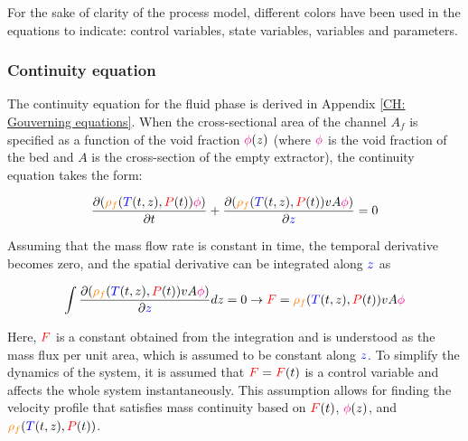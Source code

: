 \documentclass[../Article_Model_Parameters.tex]{subfiles}
\begin{document}
		
	For the sake of clarity of the process model, different colors have been used in the equations to indicate: 
	{\color{red}control variables},
	{\color{blue}state variables},
	{\color{orange}variables} and
	{\color{magenta}parameters}.
	
	\subsubsection{Continuity equation} \label{CH: Continuity}
	The continuity equation for the fluid phase is derived in Appendix \ref{CH: Gouverning equations}. When the cross-sectional area of the channel $A_f$ is specified as a function of the void fraction ${\color{magenta}\phi}(z)$ (where ${\color{magenta}\phi}$ is the void fraction of the bed and $A$ is the cross-section of the empty extractor), the continuity equation takes the form: 
	
	{\footnotesize
		\begin{equation*}
			\frac{\partial ({\color{orange}\rho_f}({\color{blue}T}(t,z),{\color{red}P}(t)) {\color{magenta}\phi})}{\partial t} + \frac{\partial ({\color{orange}\rho_f}({\color{blue}T}(t,z),{\color{red}P}(t)) v A {\color{magenta}\phi})}{\partial {\color{blue}z}} = 0
		\end{equation*}
	}
	
	Assuming that the mass flow rate is constant in time, the temporal derivative becomes zero, and the spatial derivative can be integrated along ${\color{blue}z}$ as
	
	{\footnotesize
		\begin{equation}
			\int \frac{\partial ({\color{orange}\rho_f}({\color{blue}T}(t,z),{\color{red}P}(t)) v A {\color{magenta}\phi})}{\partial {\color{blue}z}} dz = 0 \rightarrow {\color{red}F}={\color{orange}\rho_f}({\color{blue}T}(t,z),{\color{red}P}(t)) v A {\color{magenta}\phi}
		\end{equation}
	}
	
	Here, ${\color{red}F}$ is a constant obtained from the integration and is understood as the mass flux per unit area, which is assumed to be constant along ${\color{blue}z}$. To simplify the dynamics of the system, it is assumed that ${\color{red}F}={\color{red}F}(t)$ is a control variable and affects the whole system instantaneously. This assumption allows for finding the velocity profile that satisfies mass continuity based on ${\color{red}F}(t)$, ${\color{magenta}\phi}(z)$, and ${\color{orange}\rho_f}({\color{blue}T}(t,z),{\color{red}P}(t))$.
	
\end{document}
